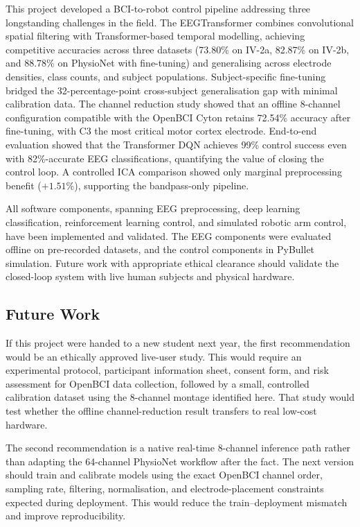 \documentclass[12pt, a4paper]{article}
\begin{document}
This project developed a BCI-to-robot control pipeline addressing three longstanding challenges in the field. The EEGTransformer combines convolutional spatial filtering with Transformer-based temporal modelling, achieving competitive accuracies across three datasets (73.80\% on IV-2a, 82.87\% on IV-2b, and 88.78\% on PhysioNet with fine-tuning) and generalising across electrode densities, class counts, and subject populations. Subject-specific fine-tuning bridged the 32-percentage-point cross-subject generalisation gap with minimal calibration data. The channel reduction study showed that an offline 8-channel configuration compatible with the OpenBCI Cyton retains 72.54\% accuracy after fine-tuning, with C3 the most critical motor cortex electrode. End-to-end evaluation showed that the Transformer DQN achieves 99\% control success even with 82\%-accurate EEG classifications, quantifying the value of closing the control loop. A controlled ICA comparison showed only marginal preprocessing benefit ($+1.51\%$), supporting the bandpass-only pipeline.

All software components, spanning EEG preprocessing, deep learning classification, reinforcement learning control, and simulated robotic arm control, have been implemented and validated. The EEG components were evaluated offline on pre-recorded datasets, and the control components in PyBullet simulation. Future work with appropriate ethical clearance should validate the closed-loop system with live human subjects and physical hardware.

\subsection{Future Work}

If this project were handed to a new student next year, the first recommendation would be an ethically approved live-user study. This would require an experimental protocol, participant information sheet, consent form, and risk assessment for OpenBCI data collection, followed by a small, controlled calibration dataset using the 8-channel montage identified here. That study would test whether the offline channel-reduction result transfers to real low-cost hardware.

The second recommendation is a native real-time 8-channel inference path rather than adapting the 64-channel PhysioNet workflow after the fact. The next version should train and calibrate models using the exact OpenBCI channel order, sampling rate, filtering, normalisation, and electrode-placement constraints expected during deployment. This would reduce the train--deployment mismatch and improve reproducibility.
\end{document}
